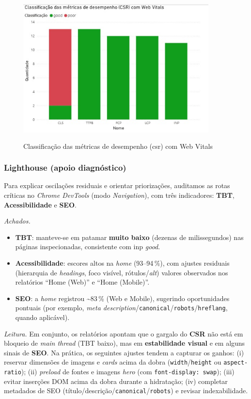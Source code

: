\begin{figure}[H]
\centering
\caption{Classificação das métricas de desempenho (\acrshort{csr}) com Web Vitals}
\includegraphics[width=0.9\textwidth]{media/metricas_csr_web_vitals.jpeg}
\label{fig:csr-webvitals}
\end{figure}

\subsubsection{Lighthouse (apoio diagnóstico)}
Para explicar oscilações residuais e orientar priorizações, auditamos as rotas críticas no \emph{Chrome DevTools} (modo \emph{Navigation}), com três indicadores: \textbf{TBT}, \textbf{Acessibilidade} e \textbf{SEO}.

\noindent \textit{Achados.}
\begin{itemize}
    \item \textbf{TBT}: manteve-se em patamar \textbf{muito baixo} (dezenas de milissegundos) nas páginas inspecionadas, consistente com \acrshort{inp} \textit{good}.
    \item \textbf{Acessibilidade}: escores altos na \emph{home} (93--94\,\%), com ajustes residuais (hierarquia de \emph{headings}, foco visível, rótulos/\textit{alt}) valores observados nos relatórios “Home (Web)” e “Home (Mobile)”.
    \item \textbf{SEO}: a \emph{home} registrou \textasciitilde{}83\,\% (Web e Mobile), sugerindo oportunidades pontuais (por exemplo, \emph{meta description}/\texttt{canonical}/\texttt{robots}/\texttt{hreflang}, quando aplicável).
\end{itemize}

\noindent \textit{Leitura.} Em conjunto, os relatórios apontam que o gargalo do \textbf{CSR} não está em bloqueio de \emph{main thread} (TBT baixo), mas em \textbf{estabilidade visual} e em alguns sinais de \textbf{SEO}. Na prática, os seguintes ajustes tendem a capturar os ganhos: (i) reservar dimensões de imagens e \emph{cards} acima da dobra (\texttt{width}/\texttt{height} ou \texttt{aspect-ratio}); (ii) \emph{preload} de fontes e imagens \emph{hero} (com \texttt{font-display: swap}); (iii) evitar inserções DOM acima da dobra durante a hidratação; (iv) completar metadados de SEO (título/descrição/\texttt{canonical}/\texttt{robots}) e revisar indexabilidade.

